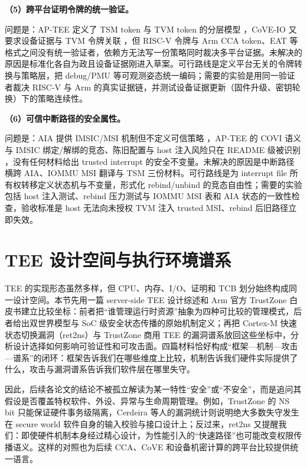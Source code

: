 \documentclass[11pt]{ctexart}
\begin{document}
\noindent\textbf{（5）跨平台证明令牌的统一验证。}\par
问题是：AP-TEE 定义了 TSM token 与 TVM token 的分层模型 \cite{riscv_ap_tee_2024}，CoVE-IO 又要求设备证据与 TVM 令牌关联 \cite{riscv_cove_io_2026}，但 RISC-V 令牌与 Arm CCA token、EAT 等格式之间没有统一验证者，依赖方无法写一份策略同时裁决多平台证据。未解决的原因是标准化各自为政且设备证据刚进入草案。可行路线是定义平台无关的令牌转换与策略层，把 debug/PMU 等可观测姿态统一编码；需要的实验是用同一验证者裁决 RISC-V 与 Arm 的真实证据链，并测试设备证据更新（固件升级、密钥轮换）下的策略连续性。\par
\noindent\textbf{（6）可信中断路径的安全属性。}\par
问题是：AIA 提供 IMSIC/MSI 机制但不定义可信策略 \cite{riscv_aia_2023}，AP-TEE 的 COVI 语义与 IMSIC 绑定/解绑的竞态、陈旧配置与 host 注入风险只在 README 级被识别 \cite{riscv_ap_tee_2024}，没有任何材料给出 trusted interrupt 的安全不变量。未解决的原因是中断路径横跨 AIA、IOMMU MSI 翻译与 TSM 三份材料。可行路线是为 interrupt file 所有权转移定义状态机与不变量，形式化 rebind/unbind 的竞态自由性；需要的实验包括 host 注入测试、rebind 压力测试与 IOMMU MSI 表和 AIA 状态的一致性检查，验收标准是 host 无法向未授权 TVM 注入 trusted MSI、rebind 后旧路径立即失效。\par
\section{TEE 设计空间与执行环境谱系}
TEE 的实现形态虽然多样，但 CPU、内存、I/O、证明和 TCB 划分始终构成同一设计空间。本节先用一篇 server-side TEE 设计综述和 Arm 官方 TrustZone 白皮书建立比较坐标：前者把``谁管理运行时资源''抽象为四种可比较的管理模式，后者给出双世界模型与 SoC 级安全状态传播的原始机制定义；再把 Cortex-M 快速状态切换漏洞（ret2ns）与 TrustZone 商用 TEE 的漏洞谱系放回这些坐标中，分析设计选择如何影响可验证性和可攻击面。四篇材料恰好构成``框架—机制—攻击—谱系''的闭环：框架告诉我们在哪些维度上比较，机制告诉我们硬件实际提供了什么，攻击与漏洞谱系告诉我们软件层在哪里失守。\par
因此，后续各论文的结论不被孤立解读为某一特性``安全''或``不安全''，而是追问其假设是否覆盖特权软件、外设、异常与生命周期管理。例如，TrustZone 的 NS bit 只能保证硬件事务级隔离，Cerdeira 等人的漏洞统计则说明绝大多数失守发生在 secure world 软件自身的输入校验与接口设计上；反过来，ret2ns 又提醒我们：即使硬件机制本身经过精心设计，为性能引入的``快速路径''也可能改变权限传播语义。这样的对照也为后续 CCA、CoVE 和设备机密计算的跨平台比较提供统一语言。\par
\end{document}
